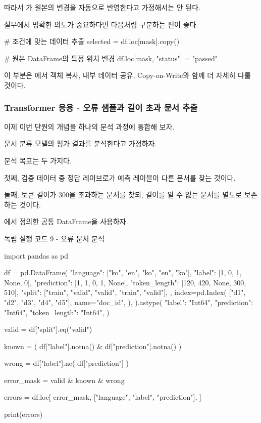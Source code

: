 따라서 가 원본의 변경을 자동으로 반영한다고 가정해서는 안 된다.

실무에서 명확한 의도가 중요하다면 다음처럼 구분하는 편이 좋다.

\begin{dhkcode}
# 조건에 맞는 데이터 추출
selected = df.loc[mask].copy()

# 원본 DataFrame의 특정 위치 변경
df.loc[mask, "status"] = "passed"
\end{dhkcode}

이 부분은 에서 객체 복사, 내부 데이터 공유, Copy-on-Write와 함께 더 자세히 다룰 것이다.

\subsubsection{Transformer 응용 - 오류 샘플과 길이 초과 문서 추출}

이제 이번 단원의 개념을 하나의 분석 과정에 통합해 보자.

문서 분류 모델의 평가 결과를 분석한다고 가정하자.

분석 목표는 두 가지다.

첫째, 검증 데이터 중 정답 레이브로가 예측 레이블이 다른 문서를 찾는 것이다.

둘째, 토큰 길이가 300을 초과하는 문서를 찾되, 길이를 알 수 없는 문서를 별도로 보존하는 것이다.

에서 정의한 공통 DataFrame을 사용하자.

\begin{dhknote}
\begin{dhksmry}[centered]
독립 실행 코드 9 - 오류 문서 분석
\end{dhksmry}
\end{dhknote}

\begin{dhkcode}
import pandas as pd

df = pd.DataFrame(
    {
        "language": ["ko", "en", "ko", "en", "ko"],
        "label": [1, 0, 1, None, 0],
        "prediction": [1, 1, 0, 1, None],
        "token_length": [120, 420, None, 300, 510],
        "split": ["train", "valid", "valid", "train", "valid"],
    },
    index=pd.Index(
        ["d1", "d2", "d3", "d4", "d5"],
        name="doc_id",
    ),
).astype({
    "label": "Int64",
    "prediction": "Int64",
    "token_length": "Int64",
})

valid = df["split"].eq("valid")

known = (
    df["label"].notna()
    & df["prediction"].notna()
)

wrong = df["label"].ne(
    df["prediction"]
)

error_mask = valid & known & wrong

errors = df.loc[
    error_mask,
    ["language", "label", "prediction"],
]

print(errors)
\end{dhkcode}

